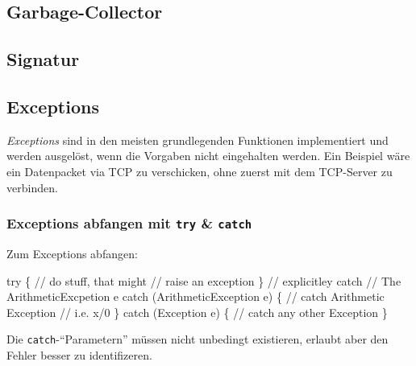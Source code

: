 \documentclass[
  9pt,
  a4paperpaper,
  DIV=11]{scrartcl}
\newenvironment{Shaded}{}{}
\newcommand{\CommentTok}[1]{\textcolor[rgb]{0.42,0.45,0.49}{#1}}
\newcommand{\KeywordTok}[1]{\textcolor[rgb]{0.84,0.23,0.29}{#1}}
\newcommand{\NormalTok}[1]{\textcolor[rgb]{0.14,0.16,0.18}{#1}}
\newcommand{\OperatorTok}[1]{\textcolor[rgb]{0.14,0.16,0.18}{#1}}
\numberwithin{equation}{section}
\begin{document}
\begin{multicols}{2}
\hypertarget{garbage-collector}{%
\subsection{Garbage-Collector}\label{garbage-collector}}

\hypertarget{signatur}{%
\subsection{Signatur}\label{signatur}}

\hypertarget{exceptions}{%
\subsection{Exceptions}\label{exceptions}}

\emph{Exceptions} sind in den meisten grundlegenden Funktionen
implementiert und werden ausgelöst, wenn die Vorgaben nicht eingehalten
werden. Ein Beispiel wäre ein Datenpacket via TCP zu verschicken, ohne
zuerst mit dem TCP-Server zu verbinden.

\hypertarget{exceptions-abfangen-mit-try-catch}{%
\subsubsection{\texorpdfstring{Exceptions abfangen mit \texttt{try} \&
\texttt{catch}}{Exceptions abfangen mit try \& catch}}\label{exceptions-abfangen-mit-try-catch}}

Zum Exceptions abfangen:

\begin{Shaded}
\begin{Highlighting}[]
\KeywordTok{try} \OperatorTok{\{}
  \CommentTok{// do stuff, that might}
  \CommentTok{// raise an exception}
\OperatorTok{\}}
\CommentTok{// explicitley catch }
\CommentTok{// The ArithmeticExcpetion e}
\KeywordTok{catch} \OperatorTok{(}\NormalTok{ArithmeticException e}\OperatorTok{)} \OperatorTok{\{}
  \CommentTok{// catch Arithmetic Exception}
  \CommentTok{// i.e. x/0}
\OperatorTok{\}}
\KeywordTok{catch} \OperatorTok{(}\NormalTok{Exception e}\OperatorTok{)} \OperatorTok{\{}
  \CommentTok{// catch any other Exception}
\OperatorTok{\}}
\end{Highlighting}
\end{Shaded}

Die \texttt{catch}-``Parametern'' müssen nicht unbedingt existieren,
erlaubt aber den Fehler besser zu identifizeren.

\hypertarget{erweiterung-finally}{%
}
\end{multicols}
\end{document}
